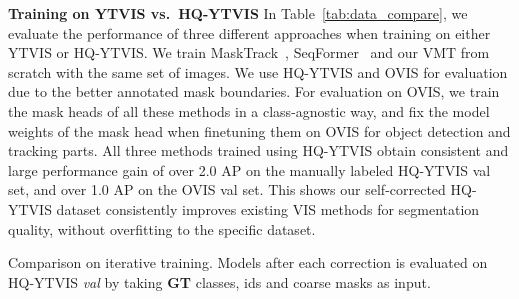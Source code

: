 \documentclass[runningheads]{llncs}
\newcommand{\parsection}[1]{\textbf{#1} }
\begin{document}
\parsection{Training on YTVIS vs.\ HQ-YTVIS} In Table~\ref{tab:data_compare}, we evaluate the performance of three different approaches when training on either YTVIS or HQ-YTVIS. We train MaskTrack~\cite{yang2019video}, SeqFormer~\cite{wu2021seqformer} and our VMT from scratch with the same set of images.
We use HQ-YTVIS and OVIS for evaluation due to the better annotated mask boundaries. For evaluation on OVIS, we train the mask heads of all these methods in a class-agnostic way, and fix the model weights of the mask head when finetuning them on OVIS for object detection and tracking parts.
All three methods trained using HQ-YTVIS obtain consistent and large performance gain of over 2.0 AP on the manually labeled HQ-YTVIS val set, and over 1.0 AP on the OVIS val set. 
This shows our self-corrected HQ-YTVIS dataset consistently improves existing VIS methods for segmentation quality, without overfitting to the specific dataset. 

\begin{table}[t]
			\centering \begin{minipage}[t]{0.48\linewidth}
		\centering \caption{Comparison on iterative training. Models after each correction is evaluated on HQ-YTVIS \textit{val} by taking \textbf{GT} classes, ids and coarse masks as input.}
			\label{tab:iters}
		\end{minipage}
		\label{tab:test1}
		\hfill
		\begin{minipage}[t]{0.5\linewidth}
			\centering \caption{Training on YTVIS \textbf{vs.} HQ-YTVIS with the same images from scratch. We evaluate the trained models  on HQ-YTVIS and OVIS \textit{val} sets.}
			\label{tab:data_compare}
		\end{minipage}\end{table}
\end{document}
